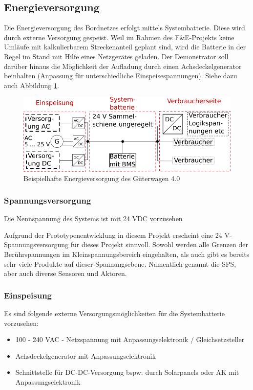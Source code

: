 \subsection{Energieversorgung}\label{sec:EV}
Die Energieversorgung des Bordnetzes erfolgt mittels Systembatterie. Diese wird durch externe Versorgung gespeist. Weil im Rahmen des F\&E-Projekts keine Umläufe mit kalkulierbarem Streckenanteil geplant sind, wird die Batterie in der Regel im Stand mit Hilfe eines Netzgerätes geladen. Der Demonstrator soll darüber hinaus die Möglichkeit der Aufladung durch einen Achsdeckelgenerator beinhalten (Anpassung für unterschiedliche Einspeisespannungen). Siehe dazu auch Abbildung \ref{fig:Soll-EV}. 
\begin{figure}[htp]
    \centering
    \includegraphics[width=\textwidth]{Bilder/20190706_SkizzeBatterieohneText.png}
    \caption{Beispielhafte Energieversorgung des Güterwagen 4.0}
    \label{fig:Soll-EV}
\end{figure}

\subsubsection{Spannungsversorgung}
\begin{feat}
Die Nennspannung des Systems ist mit 24 VDC vorzusehen
\end{feat}
\begin{rem}[zu Anf. 10]
Aufgrund der Prototypenentwicklung in diesem Projekt erscheint eine 24 V-Spannungsversorgung für dieses Projekt sinnvoll. Sowohl werden alle Grenzen der Berührspannungen im Kleinspannungsbereich eingehalten, als auch gibt es bereits sehr viele Produkte auf dieser Spannungsebene. Namentlich genannt die SPS, aber auch diverse Sensoren und Aktoren.
\end{rem}

\subsubsection{Einspeisung}
\begin{feat}
Es sind folgende externe Versorgungsmöglichkeiten für die \gls{Systembatterie} vorzusehen:
\begin{itemize}
    \item 100 - 240 VAC - Netzspannung mit Anpassungselektronik / Gleichsetzsteller
    \item Achsdeckelgenerator mit Anpassungselektronik
    \item Schnittstelle für DC-DC-Versorgung bspw. durch Solarpanels oder AK mit Anpassungselektronik
\end{itemize}
\end{feat}

